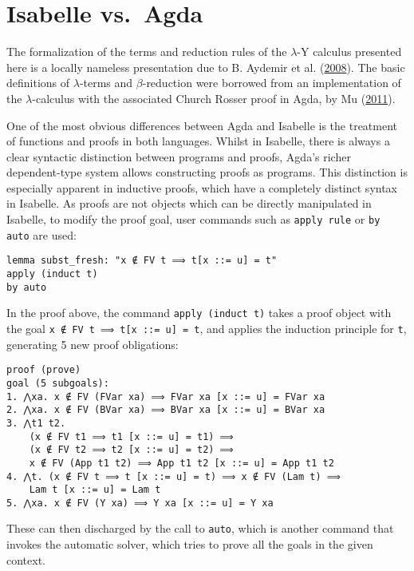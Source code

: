 \documentclass[a4paper, 12pt, twoside]{style/ociamthesis}
\theoremstyle{plain}
\theoremstyle{definition}
\theoremstyle{remark}
\begin{document}
\chapter{Isabelle vs.~Agda}\label{comp-agda}

\label{chap:compAgda}

The formalization of the terms and reduction rules of the \(\lambda\)-Y
calculus presented here is a locally nameless presentation due to B.
Aydemir et al. (\protect\hyperlink{ref-aydemir08}{2008}). The basic
definitions of \(\lambda\)-terms and \(\beta\)-reduction were borrowed
from an implementation of the \(\lambda\)-calculus with the associated
Church Rosser proof in Agda, by Mu
(\protect\hyperlink{ref-shing-cheng}{2011}).

One of the most obvious differences between Agda and Isabelle is the
treatment of functions and proofs in both languages. Whilst in Isabelle,
there is always a clear syntactic distinction between programs and
proofs, Agda's richer dependent-type system allows constructing proofs
as programs. This distinction is especially apparent in inductive
proofs, which have a completely distinct syntax in Isabelle. As proofs
are not objects which can be directly manipulated in Isabelle, to modify
the proof goal, user commands such as \texttt{apply rule} or
\texttt{by auto} are used:

\begin{verbatim}
lemma subst_fresh: "x ∉ FV t ⟹ t[x ::= u] = t"
apply (induct t)
by auto
\end{verbatim}

In the proof above, the command \texttt{apply (induct t)} takes a proof
object with the goal \texttt{x ∉ FV t ⟹ t[x ::= u] = t}, and applies the
induction principle for \texttt{t}, generating 5 new proof obligations:

\begin{verbatim}
proof (prove)
goal (5 subgoals):
1. ⋀xa. x ∉ FV (FVar xa) ⟹ FVar xa [x ::= u] = FVar xa
2. ⋀xa. x ∉ FV (BVar xa) ⟹ BVar xa [x ::= u] = BVar xa
3. ⋀t1 t2.
    (x ∉ FV t1 ⟹ t1 [x ::= u] = t1) ⟹
    (x ∉ FV t2 ⟹ t2 [x ::= u] = t2) ⟹
    x ∉ FV (App t1 t2) ⟹ App t1 t2 [x ::= u] = App t1 t2
4. ⋀t. (x ∉ FV t ⟹ t [x ::= u] = t) ⟹ x ∉ FV (Lam t) ⟹ 
    Lam t [x ::= u] = Lam t
5. ⋀xa. x ∉ FV (Y xa) ⟹ Y xa [x ::= u] = Y xa
\end{verbatim}

These can then discharged by the call to \texttt{auto}, which is another
command that invokes the automatic solver, which tries to prove all the
goals in the given context.
\end{document}
